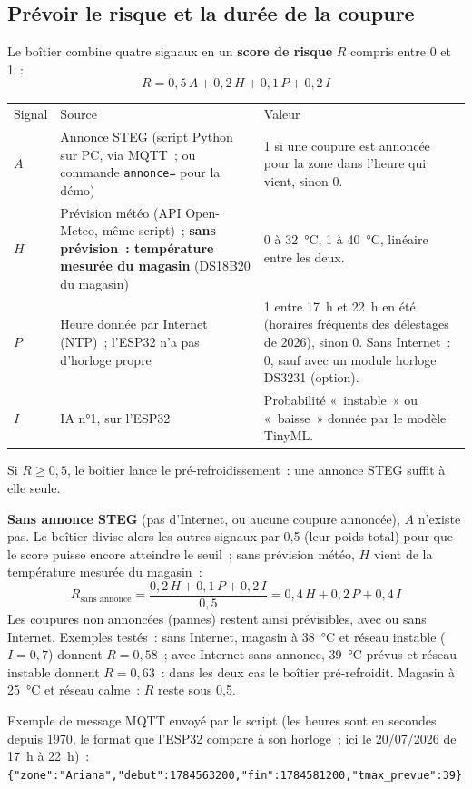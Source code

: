 \documentclass[10pt,a4paper]{article}
\begin{document}
\subsection{Prévoir le risque et la durée de la coupure}
Le boîtier combine quatre signaux en un \textbf{score de risque} $R$ compris entre 0 et 1~:
\[ R = 0{,}5\,A + 0{,}2\,H + 0{,}1\,P + 0{,}2\,I \]

\begin{tabularx}{\linewidth}{Q{0.9cm}P{5cm}L}
 Signal & \mdseries Source & \mdseries Valeur \\
$A$ & Annonce STEG (script Python sur PC, via MQTT~; ou commande \texttt{annonce=} pour la démo) & 1 si une coupure est annoncée pour la zone dans l'heure qui vient, sinon 0. \\
$H$ & Prévision météo (API Open-Meteo, même script)~; \textbf{sans prévision~: température mesurée du magasin} (DS18B20 du magasin) & 0 à 32~°C, 1 à 40~°C, linéaire entre les deux. \\
$P$ & Heure donnée par Internet (NTP)~; l'ESP32 n'a pas d'horloge propre & 1 entre 17~h et 22~h en été (horaires fréquents des délestages de 2026), sinon 0. Sans Internet~: 0, sauf avec un module horloge DS3231 (option). \\
$I$ & IA n°1, sur l'ESP32 & Probabilité «~instable~» ou «~baisse~» donnée par le modèle TinyML. \\
\end{tabularx}

Si $R \geq 0{,}5$, le boîtier lance le pré-refroidissement~: une annonce STEG suffit à elle seule.

\textbf{Sans annonce STEG} (pas d'Internet, ou aucune coupure annoncée), $A$ n'existe pas. Le boîtier divise alors les autres signaux par 0,5 (leur poids total) pour que le score puisse encore atteindre le seuil~; sans prévision météo, $H$ vient de la température mesurée du magasin~:
\[ R_{\text{sans annonce}} = \frac{0{,}2\,H + 0{,}1\,P + 0{,}2\,I}{0{,}5} = 0{,}4\,H + 0{,}2\,P + 0{,}4\,I \]
Les coupures non annoncées (pannes) restent ainsi prévisibles, avec ou sans Internet. Exemples testés~: sans Internet, magasin à 38~°C et réseau instable ($I = 0{,}7$) donnent $R = 0{,}58$~; avec Internet sans annonce, 39~°C prévus et réseau instable donnent $R = 0{,}63$~: dans les deux cas le boîtier pré-refroidit. Magasin à 25~°C et réseau calme~: $R$ reste sous 0,5.

Exemple de message MQTT envoyé par le script (les heures sont en secondes depuis 1970, le format que l'ESP32 compare à son horloge~; ici le 20/07/2026 de 17~h à 22~h)~:\\[1mm]\hspace*{1em}\texttt{\small \{"zone":"Ariana","debut":1784563200,"fin":1784581200,"tmax\_prevue":39\}}
\end{document}
